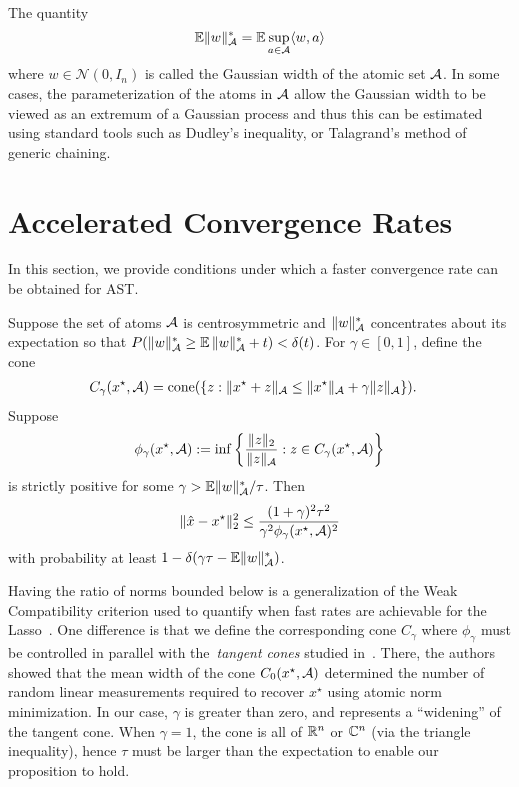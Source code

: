 The quantity 
\[
	\operatorname{\mathbb{E}}\lVert w\rVert_{\mathcal{A}}^* = \operatorname{\mathbb{E}}\sup_{a \in \mathcal{A}} \langle w, a\rangle
\]
where $w \in \mathcal{N}(0,I_n)$ is called the Gaussian width of the atomic set
$\mathcal{A}$. In some cases, the parameterization of the atoms in $\mathcal{A}$ allow the
Gaussian width to be viewed as an extremum of a Gaussian process and thus this
can be estimated using standard tools such as Dudley's inequality, or
Talagrand's method of generic chaining.


\section{Accelerated Convergence Rates} %
\label{sec:convergence-rate}
In this section, we provide conditions under which a faster convergence rate
can be obtained for AST.
\begin{prop}
Suppose the set of atoms $\mathcal{A}$ is centrosymmetric and $\lVert w\rVert_{\mathcal{A}}^*$
concentrates about its expectation so that $P( {\lVert w\rVert_{\mathcal{A}}^*} \geq
\operatorname{\mathbb{E}}{\lVert w\rVert_{\mathcal{A}}^*}+t) < \delta(t)$. For $\gamma \in [0, 1]$, define the cone
\begin{align*}
C_\gamma(x^\star,\mathcal{A}) &= \operatorname{cone}(\{z:\lVert x^\star+ z\rVert_{\mathcal{A}} \leq \lVert x^\star\rVert_{\mathcal{A}} + \gamma\lVert z\rVert_{\mathcal{A}}\}).
\end{align*}
Suppose 
\begin{equation}
\label{eq:compatibility}
\phi_\gamma(x^\star,\mathcal{A}) := \inf \left\{ \frac{\lVert z\rVert_{2}}{\lVert z\rVert_{\mathcal{A}}}  : z \in C_\gamma(x^\star,\mathcal{A}) \right\} 
\end{equation}
is strictly positive for some $\gamma > {\operatorname{\mathbb{E}}\lVert w\rVert_{\mathcal{A}}^*}/{\tau}$. Then
\begin{equation}
\label{eq:fast_rate_phi}
\lVert\hat{x}-x^\star\rVert_2^2  \leq \frac{(1+\gamma)^2 \tau^2}{\gamma^2 \phi_\gamma(x^\star,\mathcal{A})^2}
\end{equation}
with probability at least $1-\delta(\gamma\tau - \operatorname{\mathbb{E}}\lVert w\rVert_{\mathcal{A}}^*)$.
\end{prop}

Having the ratio of norms bounded below is a generalization of the Weak
Compatibility criterion used to quantify when fast rates are achievable for the
Lasso~\cite{degeer}. One difference is that we define the corresponding
cone $C_\gamma$ where $\phi_\gamma$ must be controlled in parallel with
the~\emph{tangent cones} studied in~\cite{crpw}. There, the authors showed that
the mean width of the cone $C_0(x^\star,\mathcal{A})$ determined the number of random
linear measurements required to recover $x^\star$ using atomic norm
minimization.	 In our case, $\gamma$ is greater than zero, and represents a
``widening'' of the tangent cone. When $\gamma=1$, the cone is all of $\mathbb{R}^n$ or $\mathbb{C}^n$
(via the triangle inequality), hence $\tau$ must be larger than the
expectation to enable our proposition to hold.

